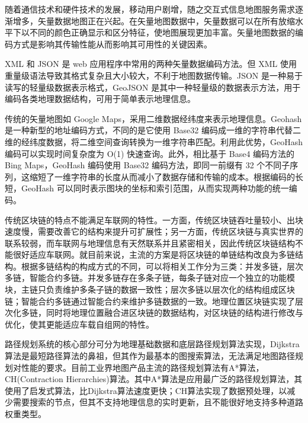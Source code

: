随着通信技术和硬件技术的发展，移动用户剧增，随之交互式信息地图服务需求逐渐增多，矢量数据地图正在兴起。在矢量地图数据中，矢量数据可以在所有放缩水平下以不同的颜色正确显示和区分特征，使地图展现更加丰富。矢量地图数据的编码方式是影响其传输性能从而影响其可用性的关键因素。

XML 和 JSON 是 web 应用程序中常用的两种矢量数据编码方法。但 XML 使用重量级语法导致其格式复杂且大小较大，不利于地图数据传输。JSON 是一种易于读写的轻量级数据表示格式，GeoJSON 是其中一种轻量级的数据表示方法，用于编码各类地理数据结构，可用于简单表示地理信息。

传统的矢量地图如 Google Maps，采用二维数据经纬度来表示地理信息。Geohash 是一种新型的地址编码方式，不同的是它使用 Base32 编码成一维的字符串代替二维的经纬度数据，将二维空间查询转换为一维字符串匹配。利用此优势，GeoHash 编码可以实现时间复杂度为 O(1) 快速查询。此外，相比基于 Base4 编码方法的 Bing Maps，GeoHash 编码使用 Base32 编码方法，即同一前缀有 32 个不同子序列，这缩短了一维字符串的长度从而减小了数据存储和传输的成本。根据编码的长短，GeoHash 可以同时表示图块的坐标和索引范围，从而实现两种功能的统一编码。

传统区块链的特点不能满足车联网的特性。一方面，传统区块链吞吐量较小、出块速度慢，需要改善它的结构来提升可扩展性；另一方面，传统区块链与真实世界的联系较弱，而车联网与地理信息有天然联系并且紧密相关，因此传统区块链结构不能很好适应车联网。就目前来说，主流的方案是将区块链的单链结构改良为多链结构。根据多链结构的构成方式的不同，可以将相关工作分为三类：并发多链，层次多链，智能合约多链。并发多链存在多条子链，每条子链对应一个独立的功能模块，主链只负责维护多条子链的数据一致性；层次多链以层次化的结构组成区块链；智能合约多链通过智能合约来维护多链数据的一致。地理位置区块链实现了层次化多链，同时将地理位置融合进区块链的数据结构，对区块链的结构进行修改与优化，使其更能适应车载自组网的特性。

路径规划系统的核心部分可分为地理基础数据和底层路径规划算法实现，Dijkstra算法是最短路径算法的鼻祖，但其作为最基本的图搜索算法，无法满足地图路径规划对性能的要求。目前工业界地图产品主流的路径规划算法有A*算法，CH(Contraction Hierarchies)算法。其中A*算法是应用最广泛的路径规划算法，其使用了启发式算法，比Dijkstra算法速度更快；CH算法实现了数据预处理，以减少需要搜索的节点，但其不支持地理信息的实时更新，且不能很好地支持多种道路权重类型。

